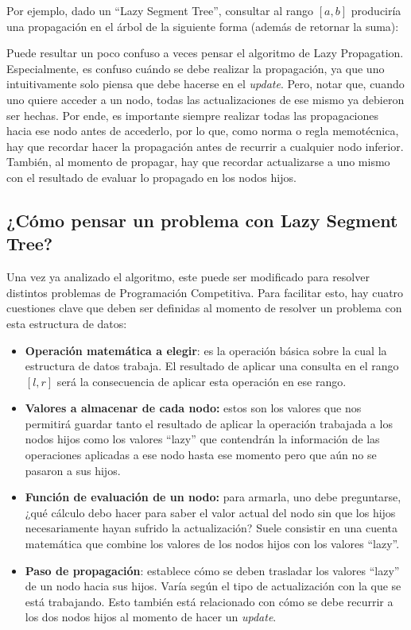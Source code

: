 \documentclass{article}
\begin{document}
Por ejemplo, dado un ``Lazy Segment Tree'', consultar al rango $[a,b]$ produciría una propagación en el árbol de la siguiente forma (además de retornar la suma):



Puede resultar un poco confuso a veces pensar el algoritmo de Lazy Propagation. Especialmente, es confuso cuándo se debe realizar la propagación, ya que uno intuitivamente solo piensa que debe hacerse en el \textit{update}. Pero, notar que, cuando uno quiere acceder a un nodo, todas las actualizaciones de ese mismo ya debieron ser hechas. Por ende, es importante siempre realizar todas las propagaciones hacia ese nodo antes de accederlo, por lo que, como norma o regla memotécnica, hay que recordar hacer la propagación antes de recurrir a cualquier nodo inferior. También, al momento de propagar, hay que recordar actualizarse a uno mismo con el resultado de evaluar lo propagado en los nodos hijos.

\subsection{¿Cómo pensar un problema con Lazy Segment Tree? }

Una vez ya analizado el algoritmo, este puede ser modificado para resolver distintos problemas de Programación Competitiva. Para facilitar esto, hay cuatro cuestiones clave que deben ser definidas al momento de resolver un problema con esta estructura de datos:


\begin{itemize}
    \item \textbf{Operación matemática a elegir}: es la operación básica sobre la cual la estructura de datos trabaja. El resultado de aplicar una consulta en el rango $[l,r]$ será la consecuencia de aplicar esta operación en ese rango.
    \item \textbf{Valores a almacenar de cada nodo:} estos son los valores que nos permitirá guardar tanto el resultado de aplicar la operación trabajada a los nodos hijos como los valores ``lazy'' que contendrán la información de las operaciones aplicadas a ese nodo hasta ese momento pero que aún no se pasaron a sus hijos.
    \item  \textbf{Función de evaluación de un nodo:} para armarla, uno debe preguntarse, ¿qué cálculo debo hacer para saber el valor actual del nodo sin que los hijos necesariamente hayan sufrido la actualización? Suele consistir en una cuenta matemática que combine los valores de los nodos hijos con los valores ``lazy''.
    \item \textbf{Paso de propagación}: establece cómo se deben trasladar los valores ``lazy'' de un nodo hacia sus hijos. Varía según el tipo de actualización con la que se está trabajando. Esto también está relacionado con cómo se debe recurrir a los dos nodos hijos al momento de hacer un \textit{update}.
\end{itemize}
\end{document}
